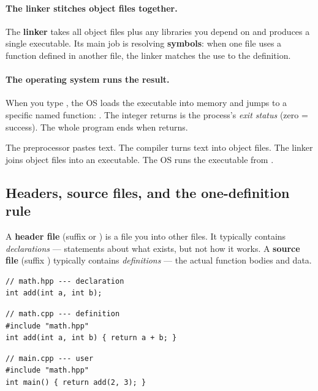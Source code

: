 \paragraph{The linker stitches object files together.}
The \textbf{linker} takes all object files plus any libraries you
depend on and produces a single executable. Its main job is
resolving \textbf{symbols}: when one file uses a function defined in
another file, the linker matches the use to the definition.

\paragraph{The operating system runs the result.}
When you type , the OS loads the executable into
memory and jumps to a specific named function: . The
integer  returns is the process's \emph{exit status}
(zero = success). The whole program ends when  returns.

\begin{idea}
The preprocessor pastes text. The compiler turns text into object
files. The linker joins object files into an executable. The OS runs
the executable from .
\end{idea}

\subsection{Headers, source files, and the one-definition rule}

A \textbf{header file} (suffix  or ) is a file
you  into other files. It typically contains
\emph{declarations} --- statements about what exists, but not how it
works. A \textbf{source file} (suffix ) typically contains
\emph{definitions} --- the actual function bodies and data.

\begin{lstlisting}
// math.hpp --- declaration
int add(int a, int b);
\end{lstlisting}

\begin{lstlisting}
// math.cpp --- definition
#include "math.hpp"
int add(int a, int b) { return a + b; }
\end{lstlisting}

\begin{lstlisting}
// main.cpp --- user
#include "math.hpp"
int main() { return add(2, 3); }
\end{lstlisting}

